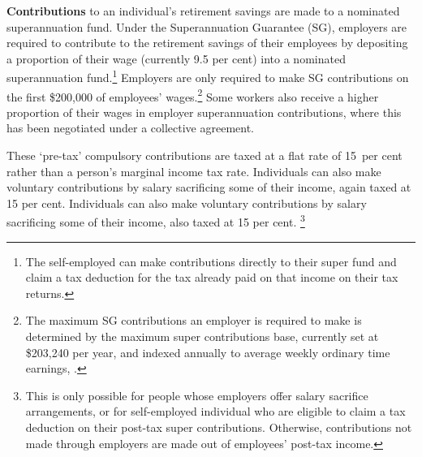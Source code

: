 \begin{figure}
\begin{minipage}[t]{0.33\columnwidth}
\vspace{5pt}
\end{minipage}
\end{figure}

\textbf{Contributions} to an individual’s retirement savings are made to a nominated superannuation fund. Under the Superannuation Guarantee (SG), employers are required to contribute to the retirement savings of their employees by depositing a proportion of their wage (currently 9.5 per cent) into a nominated superannuation fund.\footnote{The self-employed can make contributions directly to their super fund and claim a tax deduction for the tax already paid on that income on their tax returns.} Employers are only required to make SG contributions on the first \$200,000 of employees’ wages.\footnote{The maximum SG contributions an employer is required to make is determined by the maximum super contributions base, currently set at \$203,240 per year, and indexed annually to average weekly ordinary time earnings, \textcite{ATO2015MaxSuperContrBase}.} Some workers also receive a higher proportion of their wages in employer superannuation contributions, where this has been negotiated under a collective agreement.


These ‘pre-tax’ compulsory contributions are taxed at a flat rate of 15~per cent rather than a person’s marginal income tax rate. Individuals can also make voluntary contributions by salary sacrificing some of their income, again taxed at 15 per cent. Individuals can also make voluntary contributions by salary sacrificing some of their income, also taxed at 15 per cent.%
\footnote{%
This is only possible for people whose employers offer salary sacrifice arrangements, or for self-employed individual who are eligible to claim a tax deduction on their post-tax super contributions. Otherwise, contributions not made through employers are made out of employees’ post-tax income.%
}  

